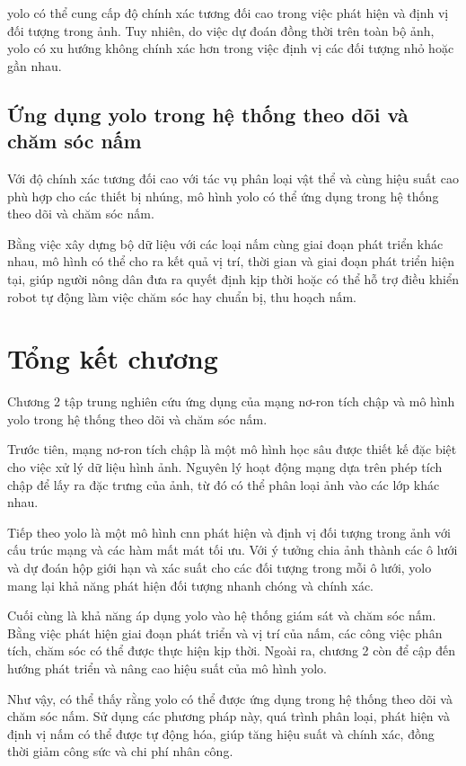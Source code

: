 \acrshort{yolo} có thể cung cấp độ chính xác tương đối cao trong việc phát hiện và định vị đối tượng trong ảnh. Tuy nhiên, do việc dự đoán đồng thời trên toàn bộ ảnh, \acrshort{yolo} có xu hướng không chính xác hơn trong việc định vị các đối tượng nhỏ hoặc gần nhau.


\subsection{Ứng dụng \acrshort{yolo} trong hệ thống theo dõi và chăm sóc nấm}

Với độ chính xác tương đối cao với tác vụ phân loại vật thể và cùng hiệu suất cao phù hợp cho các thiết bị nhúng, mô hình \acrshort{yolo} có thể ứng dụng trong hệ thống theo dõi và chăm sóc nấm. 

Bằng việc xây dựng bộ dữ liệu với các loại nấm cùng giai đoạn phát triển khác nhau, mô hình có thể cho ra kết quả vị trí, thời gian và giai đoạn phát triển hiện tại, giúp người nông dân đưa ra quyết định kịp thời hoặc có thể hỗ trợ điều khiển robot tự động làm việc chăm sóc hay chuẩn bị, thu hoạch nấm.



\section{Tổng kết chương}


Chương 2 tập trung nghiên cứu ứng dụng của mạng nơ-ron tích chập và mô hình \acrshort{yolo} trong hệ thống theo dõi và chăm sóc nấm.

Trước tiên, mạng nơ-ron tích chập là một mô hình học sâu được thiết kế đặc biệt cho việc xử lý dữ liệu hình ảnh. Nguyên lý hoạt động mạng dựa trên phép tích chập để lấy ra đặc trưng của ảnh, từ đó có thể phân loại ảnh vào các lớp khác nhau.

Tiếp theo \acrshort{yolo} là một mô hình \acrshort{cnn} phát hiện và định vị đối tượng trong ảnh với cấu trúc mạng và các hàm mất mát tối ưu. Với ý tưởng chia ảnh thành các ô lưới và dự đoán hộp giới hạn và xác suất cho các đối tượng trong mỗi ô lưới, \acrshort{yolo} mang lại khả năng phát hiện đối tượng nhanh chóng và chính xác.

Cuối cùng là khả năng áp dụng \acrshort{yolo} vào hệ thống giám sát và chăm sóc nấm. Bằng việc phát hiện giai đoạn phát triển và vị trí của nấm, các công việc phân tích, chăm sóc có thể được thực hiện kịp thời. Ngoài ra, chương 2 còn để cập đến hướng phát triển và nâng cao hiệu suất của mô hình \acrshort{yolo}.

Như vậy, có thể thấy rằng \acrshort{yolo} có thể được ứng dụng trong hệ thống theo dõi và chăm sóc nấm. Sử dụng các phương pháp này, quá trình phân loại, phát hiện và định vị nấm có thể được tự động hóa, giúp tăng hiệu suất và chính xác, đồng thời giảm công sức và chi phí nhân công.

